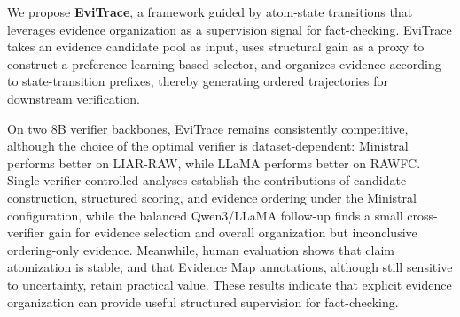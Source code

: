\documentclass[letterpaper]{article}
\begin{document}


We propose \textbf{EviTrace}, a framework guided by atom-state transitions that leverages evidence organization as a supervision signal for fact-checking. EviTrace takes an evidence candidate pool as input, uses structural gain as a proxy to construct a preference-learning-based selector, and organizes evidence according to state-transition prefixes, thereby generating ordered trajectories for downstream verification.

On two 8B verifier backbones, EviTrace remains consistently competitive, although the choice of the optimal verifier is dataset-dependent: Ministral performs better on LIAR-RAW, while LLaMA performs better on RAWFC. Single-verifier controlled analyses establish the contributions of candidate construction, structured scoring, and evidence ordering under the Ministral configuration, while the balanced Qwen3/LLaMA follow-up finds a small cross-verifier gain for evidence selection and overall organization but inconclusive ordering-only evidence. Meanwhile, human evaluation shows that claim atomization is stable, and that Evidence Map annotations, although still sensitive to uncertainty, retain practical value. These results indicate that explicit evidence organization can provide useful structured supervision for fact-checking.
\end{document}
